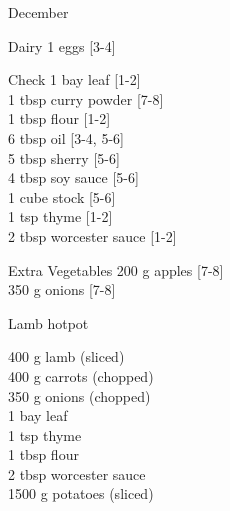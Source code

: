 \begin{menu}{December}
\begin{shoppinglist}{Dairy}
      1  eggs 
        {\scriptsize[3-4]}\\
      \end{shoppinglist}%
      \par\vfil %
      \vfil\clearpage %
      \begin{shoppinglist}{Check}
      1  bay leaf 
        {\scriptsize[1-2]}\\
      1 tbsp curry powder 
        {\scriptsize[7-8]}\\
      1 tbsp flour 
        {\scriptsize[1-2]}\\
      6 tbsp oil 
        {\scriptsize[3-4, 5-6]}\\
      5 tbsp sherry 
        {\scriptsize[5-6]}\\
      4 tbsp soy sauce 
        {\scriptsize[5-6]}\\
      1 cube stock 
        {\scriptsize[5-6]}\\
      1 tsp thyme 
        {\scriptsize[1-2]}\\
      2 tbsp worcester sauce 
        {\scriptsize[1-2]}\\
      \end{shoppinglist}%
      \begin{shoppinglist}{Extra Vegetables}
      200 g apples 
        {\scriptsize[7-8]}\\
      350 g onions 
        {\scriptsize[7-8]}\\
      \end{shoppinglist}%
      \par\vfil %
    \vfil\clearpage
  
    \begin{recipe}{2}{Lamb hotpot}%
		\begin{ingredients}
		400 g lamb (sliced) \\
	400 g carrots (chopped) \\
	350 g onions (chopped) \\
	1  bay leaf  \\
	1 tsp thyme  \\
	1 tbsp flour  \\
	2 tbsp worcester sauce  \\
	1500 g potatoes (sliced) \\
	
		\end{ingredients}
	

\end{recipe}
\end{menu}
